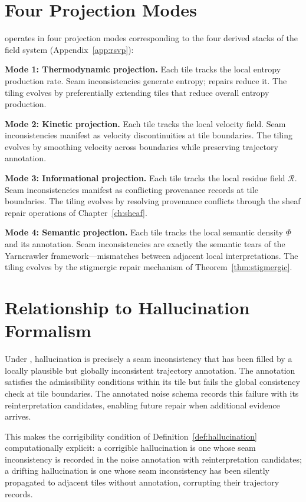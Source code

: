 \section{Four Projection Modes}

\TARTAN operates in four projection modes corresponding to the four derived
stacks of the \RSVP field system (Appendix~\ref{app:rsvp}):

\textbf{Mode 1: Thermodynamic projection.} Each tile tracks the local entropy
production rate. Seam inconsistencies generate entropy; repairs reduce it.
The tiling evolves by preferentially extending tiles that reduce overall entropy
production.

\textbf{Mode 2: Kinetic projection.} Each tile tracks the local velocity field.
Seam inconsistencies manifest as velocity discontinuities at tile boundaries.
The tiling evolves by smoothing velocity across boundaries while preserving
trajectory annotation.

\textbf{Mode 3: Informational projection.} Each tile tracks the local residue
field $\mathcal{R}$. Seam inconsistencies manifest as conflicting provenance
records at tile boundaries. The tiling evolves by resolving provenance conflicts
through the sheaf repair operations of Chapter~\ref{ch:sheaf}.

\textbf{Mode 4: Semantic projection.} Each tile tracks the local semantic
density $\Phi$ and its annotation. Seam inconsistencies are exactly the
semantic tears of the Yarncrawler framework---mismatches between adjacent
local interpretations. The tiling evolves by the stigmergic repair mechanism
of Theorem~\ref{thm:stigmergic}.

\section{Relationship to Hallucination Formalism}

\claimH Under \TARTAN, hallucination is precisely a seam inconsistency that
has been filled by a locally plausible but globally inconsistent trajectory
annotation. The annotation satisfies the admissibility conditions within its
tile but fails the global consistency check at tile boundaries. The annotated
noise schema records this failure with its reinterpretation candidates, enabling
future repair when additional evidence arrives.

This makes the corrigibility condition of Definition~\ref{def:hallucination}
computationally explicit: a corrigible hallucination is one whose seam
inconsistency is recorded in the noise annotation with reinterpretation
candidates; a drifting hallucination is one whose seam inconsistency has been
silently propagated to adjacent tiles without annotation, corrupting their
trajectory records.
